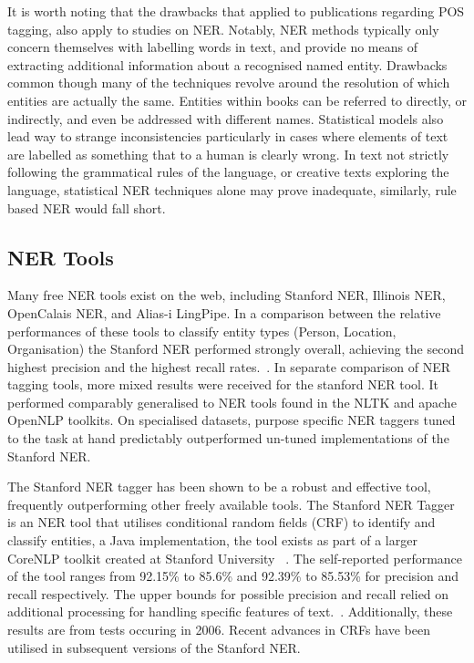 \documentclass[10pt]{report}
\begin{document}
 It is worth noting that the drawbacks that applied to publications regarding POS tagging, also apply to studies on NER. Notably, NER methods typically only concern themselves with labelling words in text, and provide no means of extracting additional information about a recognised named entity. Drawbacks common though many of the techniques revolve around the resolution of which entities are actually the same. Entities within books can be referred to directly, or indirectly, and even be addressed with different names. Statistical models also lead way to strange inconsistencies particularly in cases where elements of text are labelled as something that to a human is clearly wrong. In text not strictly following the grammatical rules of the language, or creative texts exploring the language, statistical NER techniques alone may prove inadequate, similarly, rule based NER would fall short.   

 \subsection{NER Tools}
 Many free NER tools exist on the web, including Stanford NER, Illinois NER, OpenCalais NER, and Alias-i LingPipe. In a comparison between the relative performances of these tools to classify entity types (Person, Location, Organisation) the Stanford NER performed strongly overall, achieving the second highest precision and the highest recall rates.~\cite{Atdag2013-qo}. In separate comparison of NER tagging tools, more mixed results were received for the stanford NER tool. It performed comparably generalised to NER tools found in the NLTK and apache OpenNLP toolkits. On specialised datasets, purpose specific NER taggers tuned to the task at hand predictably outperformed un-tuned implementations of the Stanford NER.
 
The Stanford NER tagger has been shown to be a robust and effective tool, frequently outperforming other freely available tools. The Stanford NER Tagger is an NER tool that utilises conditional random fields (CRF) to identify and classify entities, a Java implementation, the tool exists as part of a larger CoreNLP toolkit created at Stanford University  ~\cite{Finkel2005-uz}. The self-reported performance of the tool ranges from 92.15\% to 85.6\% and 92.39\% to 85.53\% for precision and recall respectively. The upper bounds for possible precision and recall relied on additional processing for handling specific features of text.~\cite{noauthor_undated-ik}. Additionally, these results are from tests occuring in 2006. Recent advances in CRFs have been utilised in subsequent versions of the Stanford NER.
\end{document}
